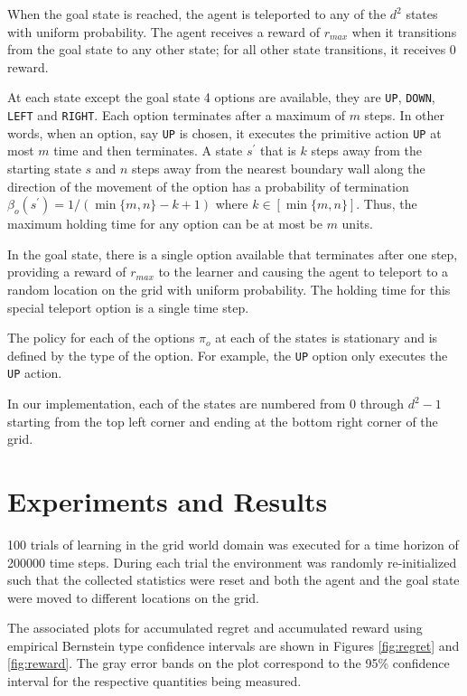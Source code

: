 When the goal state is reached, the agent is teleported to any of the $d^2$ states with uniform probability.
The agent receives a reward of $r_{max}$ when it transitions from the goal state to any other state; for all other state transitions, it receives 0 reward.

At each state except the goal state 4 options are available, they are \texttt{UP}, \texttt{DOWN}, \texttt{LEFT} and \texttt{RIGHT}.
Each option terminates after a maximum of $m$ steps. 
In other words, when an option, say \texttt{UP} is chosen, it executes the primitive action \texttt{UP} at most $m$ time and then terminates.
A state $s^\prime$ that is $k$ steps away from the starting state $s$ and $n$ steps away from the nearest boundary wall along the direction of the movement of the option has a probability of termination $\beta_o(s^\prime) = 1/(\min\{m, n\} - k + 1)$ where $k \in [\min\{m, n\}]$.
Thus, the maximum holding time for any option can be at most be $m$ units.

In the goal state, there is a single option available that terminates after one step, providing a reward of $r_{max}$ to the learner and causing the agent to teleport to a random location on the grid with uniform probability.
The holding time for this special teleport option is a single time step.

The policy for each of the options $\pi_o$ at each of the states is stationary and is defined by the type of the option.
For example, the \texttt{UP} option only executes the \texttt{UP} action.

In our implementation, each of the states are numbered from 0 through $d^2 - 1$ starting from the top left corner and ending at the bottom right corner of the grid.


\section{Experiments and Results}

100 trials of learning in the grid world domain was executed for a time horizon of 200000 time steps.
During each trial the environment was randomly re-initialized such that the collected statistics were reset and both the agent and the goal state were moved to different locations on the grid.

The associated plots for accumulated regret and accumulated reward using empirical Bernstein type confidence intervals are shown in Figures \ref{fig:regret} and \ref{fig:reward}.
The gray error bands on the plot correspond to the 95\% confidence interval for the respective quantities being measured.

